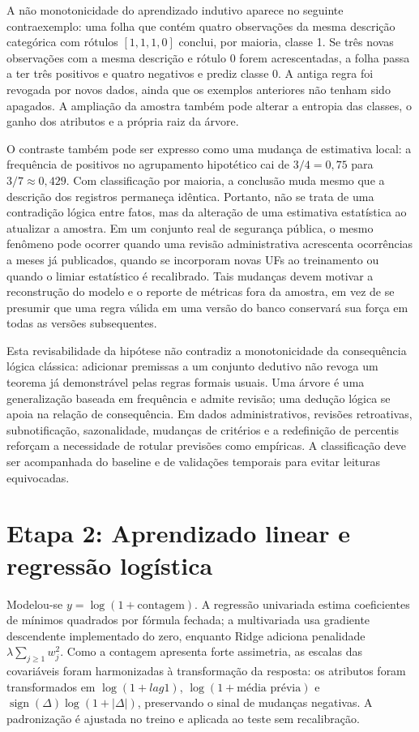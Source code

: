 \documentclass[12pt,a4paper]{article}
\begin{document}
A não monotonicidade do aprendizado indutivo aparece no seguinte contraexemplo: uma folha que contém quatro observações da mesma descrição categórica com rótulos $[1,1,1,0]$ conclui, por maioria, classe 1. Se três novas observações com a mesma descrição e rótulo 0 forem acrescentadas, a folha passa a ter três positivos e quatro negativos e prediz classe 0. A antiga regra foi revogada por novos dados, ainda que os exemplos anteriores não tenham sido apagados. A ampliação da amostra também pode alterar a entropia das classes, o ganho dos atributos e a própria raiz da árvore.

O contraste também pode ser expresso como uma mudança de estimativa local: a frequência de positivos no agrupamento hipotético cai de $3/4=0{,}75$ para $3/7\approx0{,}429$. Com classificação por maioria, a conclusão muda mesmo que a descrição dos registros permaneça idêntica. Portanto, não se trata de uma contradição lógica entre fatos, mas da alteração de uma estimativa estatística ao atualizar a amostra. Em um conjunto real de segurança pública, o mesmo fenômeno pode ocorrer quando uma revisão administrativa acrescenta ocorrências a meses já publicados, quando se incorporam novas UFs ao treinamento ou quando o limiar estatístico é recalibrado. Tais mudanças devem motivar a reconstrução do modelo e o reporte de métricas fora da amostra, em vez de se presumir que uma regra válida em uma versão do banco conservará sua força em todas as versões subsequentes.

Esta revisabilidade da hipótese não contradiz a monotonicidade da consequência lógica clássica: adicionar premissas a um conjunto dedutivo não revoga um teorema já demonstrável pelas regras formais usuais. Uma árvore é uma generalização baseada em frequência e admite revisão; uma dedução lógica se apoia na relação de consequência. Em dados administrativos, revisões retroativas, subnotificação, sazonalidade, mudanças de critérios e a redefinição de percentis reforçam a necessidade de rotular previsões como empíricas. A classificação deve ser acompanhada do baseline e de validações temporais para evitar leituras equivocadas.

\section{Etapa 2: Aprendizado linear e regressão logística}
Modelou-se $y=\log(1+\text{contagem})$. A regressão univariada estima coeficientes de mínimos quadrados por fórmula fechada; a multivariada usa gradiente descendente implementado do zero, enquanto Ridge adiciona penalidade $\lambda\sum_{j\ge1}w_j^2$. Como a contagem apresenta forte assimetria, as escalas das covariáveis foram harmonizadas à transformação da resposta: os atributos foram transformados em $\log(1+lag1)$, $\log(1+\text{média prévia})$ e $\operatorname{sign}(\Delta)\log(1+|\Delta|)$, preservando o sinal de mudanças negativas. A padronização é ajustada no treino e aplicada ao teste sem recalibração.
\end{document}
